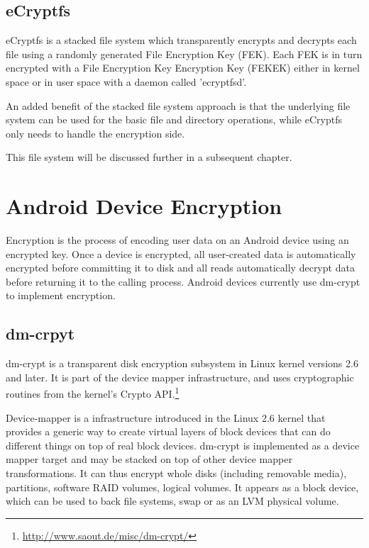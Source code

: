 \subsection{eCryptfs}
\label{sub-sec:sa-ecryptfs}

eCryptfs is a stacked file system which transparently encrypts and decrypts each file using a randomly generated File Encryption Key (FEK). Each FEK is in turn encrypted with a File Encryption Key Encryption Key (FEKEK) either in kernel space or in user space with a daemon called 'ecryptfsd'.

An added benefit of the stacked file system approach is that the underlying file system can be used for the basic file and directory operations, while eCryptfs only needs to handle the encryption side.

This file system will be discussed further in a subsequent chapter.

\section{Android Device Encryption}
\label{sec:and-dev-enc}

Encryption is the process of encoding user data on an Android device using an encrypted key. Once a device is encrypted, all user-created data is automatically encrypted before committing it to disk and all reads automatically decrypt data before returning it to the calling process.
Android devices currently use dm-crypt to implement encryption.

\subsection{dm-crpyt}
\label{sub-sec:dm-crypt}

dm-crypt is a transparent disk encryption subsystem in Linux kernel versions 2.6 and later. It is part of the device mapper infrastructure, and uses cryptographic routines from the kernel's Crypto API.\footnote{\url{http://www.saout.de/misc/dm-crypt/}}

Device-mapper is a infrastructure introduced in the Linux 2.6 kernel that provides a generic way to create virtual layers of block devices that can do different things on top of real block devices.
dm-crypt is implemented as a device mapper target and may be stacked on top of other device mapper transformations. It can thus encrypt whole disks (including removable media), partitions, software RAID volumes, logical volumes. It appears as a block device, which can be used to back file systems, swap or as an LVM physical volume.

